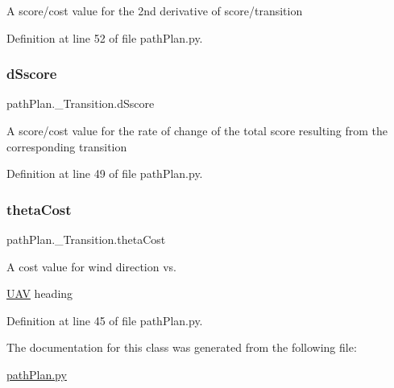 A score/cost value for the 2nd derivative of score/transition 



Definition at line 52 of file path\+Plan.\+py.

\mbox{\label{classpath_plan_1_1___transition_afa609d3874eb34ae2aa3efa67d762896}} 
\subsubsection{\texorpdfstring{d\+Sscore}{dSscore}}
{\footnotesize\ttfamily path\+Plan.\+\_\+\+Transition.\+d\+Sscore}



A score/cost value for the rate of change of the total score resulting from the corresponding transition 



Definition at line 49 of file path\+Plan.\+py.

\mbox{\label{classpath_plan_1_1___transition_a405e375ebe2b2a5d66b50721c338c6e8}} 
\subsubsection{\texorpdfstring{theta\+Cost}{thetaCost}}
{\footnotesize\ttfamily path\+Plan.\+\_\+\+Transition.\+theta\+Cost}



A cost value for wind direction vs. 

\mbox{\hyperlink{classpath_plan_1_1_u_a_v}{U\+AV}} heading 

Definition at line 45 of file path\+Plan.\+py.



The documentation for this class was generated from the following file\+:\begin{DoxyCompactItemize}
\item 
\mbox{\hyperlink{path_plan_8py}{path\+Plan.\+py}}\end{DoxyCompactItemize}
